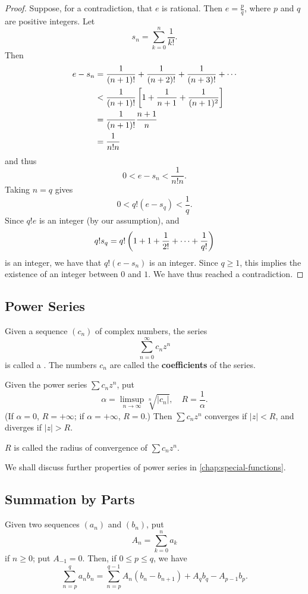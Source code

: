 \begin{proof}
Suppose, for a contradiction, that $e$ is rational. Then $e=\frac{p}{q}$, where $p$ and $q$ are positive integers. Let
\[s_n=\sum_{k=0}^{n}\frac{1}{k!}.\]
Then
\begin{align*}
e-s_n
&=\frac{1}{(n+1)!}+\frac{1}{(n+2)!}+\frac{1}{(n+3)!}+\cdots\\
&<\frac{1}{(n+1)!}\left[1+\frac{1}{n+1}+\frac{1}{(n+1)^2}\right]\\
&=\frac{1}{(n+1)!}\frac{n+1}{n}\\
&=\frac{1}{n!n}
\end{align*}
and thus
\[0<e-s_n<\frac{1}{n!n}.\]
Taking $n=q$ gives
\[0<q!(e-s_q)<\frac{1}{q}.\]
Since $q!e$ is an integer (by our assumption), and
\[q!s_q=q!\left(1+1+\frac{1}{2!}+\cdots+\frac{1}{q!}\right)\]
is an integer, we have that $q!(e-s_n)$ is an integer. Since $q\ge1$, this implies the existence of an integer between $0$ and $1$. We have thus reached a contradiction.
\end{proof}

\subsection{Power Series}
\begin{definition}
Given a sequence $(c_n)$ of complex numbers, the series
\[\sum_{n=0}^{\infty}c_nz^n\]
is called a . The numbers $c_n$ are called the \textbf{coefficients} of the series.
\end{definition}

\begin{proposition}
Given the power series $\sum c_nz^n$, put
\[\alpha=\limsup_{n\to\infty}\sqrt[n]{|c_n|},\quad R=\frac{1}{\alpha}.\]
(If $\alpha=0$, $R=+\infty$; if $\alpha=+\infty$, $R=0$.) Then $\sum c_nz^n$ converges if $|z|<R$, and diverges if $|z|>R$.
\end{proposition}

$R$ is called the radius of convergence of $\sum c_nz^n$.

We shall discuss further properties of power series in \cref{chap:special-functions}.

\subsection{Summation by Parts}
\begin{proposition}
Given two sequences $(a_n)$ and $(b_n)$, put
\[A_n=\sum_{k=0}^{n}a_k\]
if $n\ge0$; put $A_{-1}=0$. Then, if $0\le p\le q$, we have
\[\sum_{n=p}^{q}a_nb_n=\sum_{n=p}^{q-1}A_n(b_n-b_{n+1})+A_qb_q-A_{p-1}b_p.\]
\end{proposition}

